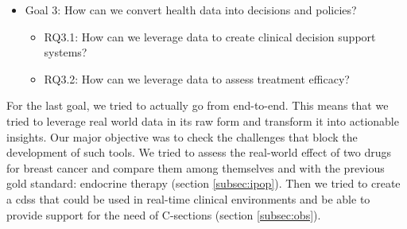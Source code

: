\begin{itemize}
    \item Goal 3: How can we convert health data into decisions and policies?
    \begin{itemize}
        \item RQ3.1: How can we leverage data to create clinical decision support systems?
        \item RQ3.2: How can we leverage data to assess treatment efficacy?
    \end{itemize}    
\end{itemize}

For the last goal, we tried to actually go from end-to-end. This means that we tried to leverage real world data in its raw form and transform it into actionable insights. Our major objective was to check the challenges that block the development of such tools. We tried to assess the real-world effect of two drugs for breast cancer and compare them among themselves and with the previous gold standard: endocrine therapy (section \ref{subsec:ipop}). Then we tried to create a \ac{cdss} that could be used in real-time clinical environments and be able to provide support for the need of C-sections (section \ref{subsec:obs}). 